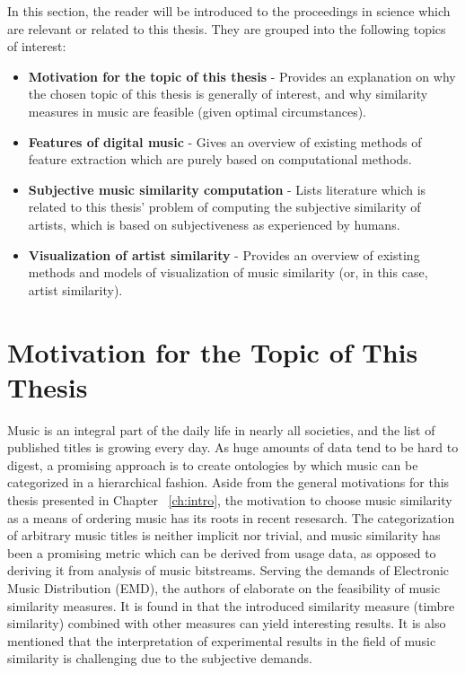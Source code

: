 In this section, the reader will be introduced to the proceedings in science which are
relevant or related to this thesis. They are grouped into the following topics of interest:

\begin{itemize}
	\item \textbf {Motivation for the topic of this thesis} - Provides an explanation on why the chosen 
		  topic of this thesis is generally of interest, and why similarity measures in music are feasible
		  (given optimal circumstances).
	\item \textbf {Features of digital music} - Gives an overview of existing methods of 
		  feature extraction which are purely based on computational methods.
	\item \textbf {Subjective music similarity computation} - Lists literature which is related
		  to this thesis' problem of computing the subjective similarity of artists, which is
		  based on subjectiveness as experienced by humans.
	\item \textbf {Visualization of artist similarity} - Provides an overview of existing 
		  methods and models of visualization of music similarity (or, in this case, artist similarity).
\end{itemize}

\section{Motivation for the Topic of This Thesis}

Music is an integral part of the daily life in nearly all societies, and the list of published titles 
is growing every day. As huge amounts of data tend to be hard to digest, a promising approach is to create ontologies  
by which music can be categorized in a hierarchical fashion. Aside from the general motivations for this thesis presented in Chapter ~\ref{ch:intro}, the motivation to choose music similarity as a means of ordering music has its roots in recent resesarch. The categorization of arbitrary music titles
is neither implicit nor trivial, and music similarity has been a promising metric which can be derived from usage data, as opposed to deriving it from analysis of music bitstreams.
Serving the demands of Electronic Music Distribution (EMD), the authors of \cite{pachet:02g} elaborate
on the feasibility of music similarity measures. It is found in \cite{pachet:02g} that the introduced
similarity measure (timbre similarity) combined with other measures can yield interesting results. It is
also mentioned that the interpretation of experimental results in the field of music similarity is challenging
due to the subjective demands. 

